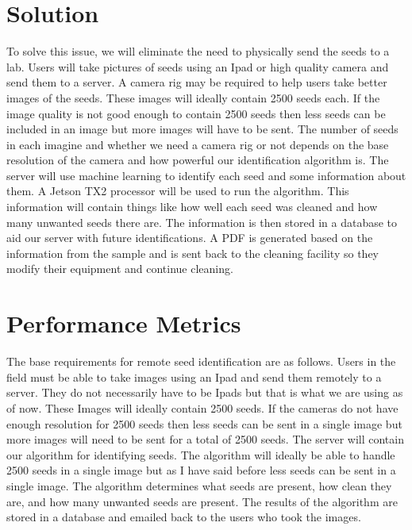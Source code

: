 \documentclass[onecolumn, draftclsnofoot,10pt, compsoc]{IEEEtran}
\begin{document}
\section{Solution}
To solve this issue, we will eliminate the need to physically send the seeds to a lab.
Users will take pictures of seeds using an Ipad or high quality camera and send them to a server.
A camera rig may be required to help users take better images of the seeds.
These images will ideally contain 2500 seeds each.
If the image quality is not good enough to contain 2500 seeds then less seeds can be included in an image but more images will have to be sent.
The number of seeds in each imagine and whether we need a camera rig or not depends on the base resolution of the camera and how powerful our identification algorithm is.
The server will use machine learning to identify each seed and some information about them.
A Jetson TX2 processor will be used to run the algorithm.
This information will contain things like how well each seed was cleaned and how many unwanted seeds there are.
The information is then stored in a database to aid our server with future identifications.
A PDF is generated based on the information from the sample and is sent back to the cleaning facility so they modify their equipment and continue cleaning.

\section{Performance Metrics}
The base requirements for remote seed identification are as follows.
Users in the field must be able to take images using an Ipad and send them remotely to a server.
They do not necessarily have to be Ipads but that is what we are using as of now.
These Images will ideally contain 2500 seeds.
If the cameras do not have enough resolution for 2500 seeds then less seeds can be sent in a single image but more images will need to be sent for a total of 2500 seeds.
The server will contain our algorithm for identifying seeds.
The algorithm will ideally be able to handle 2500 seeds in a single image but as I have said before less seeds can be sent in a single image.
The algorithm determines what seeds are present, how clean they are, and how many unwanted seeds are present.
The results of the algorithm are stored in a database and emailed back to the users who took the images.
\end{document}
